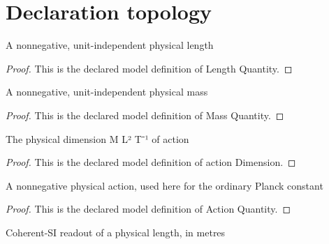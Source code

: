 \section{Declaration topology}
\begin{definition}
  \label{def:physics:phyx-mini-0580:phyxminiproblems-problemphyxmini0580-lengthquantity}
  A nonnegative, unit-independent physical length
\end{definition}
\begin{proof}
  This is the declared model definition of Length Quantity.
\end{proof}
\begin{definition}
  \label{def:physics:phyx-mini-0580:phyxminiproblems-problemphyxmini0580-massquantity}
  A nonnegative, unit-independent physical mass
\end{definition}
\begin{proof}
  This is the declared model definition of Mass Quantity.
\end{proof}
\begin{definition}
  \label{def:physics:phyx-mini-0580:phyxminiproblems-problemphyxmini0580-actiondimension}
  The physical dimension M L² T⁻¹ of action
\end{definition}
\begin{proof}
  This is the declared model definition of action Dimension.
\end{proof}
\begin{definition}
  \label{def:physics:phyx-mini-0580:phyxminiproblems-problemphyxmini0580-actionquantity}
  A nonnegative physical action, used here for the ordinary Planck constant
\end{definition}
\begin{proof}
  This is the declared model definition of Action Quantity.
\end{proof}
\begin{definition}
  \label{def:physics:phyx-mini-0580:phyxminiproblems-problemphyxmini0580-lengthinmeters}
  Coherent-SI readout of a physical length, in metres
\end{definition}
